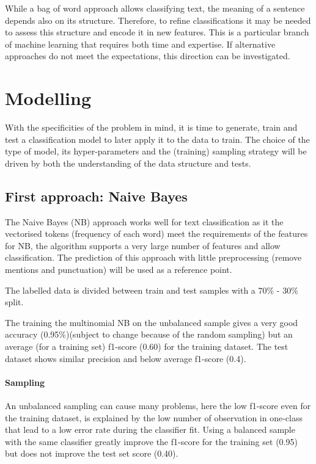 \documentclass[a4paper, justified]{tufte-handout}
\begin{document}
\begin{fullwidth}
While a bag of word approach allows classifying text, the meaning of a sentence depends also on its structure. Therefore, to refine classifications it may be needed to assess this structure and encode it in new features. This is a particular branch of machine learning that requires both time and expertise. If alternative approaches do not meet the expectations, this direction can be investigated.

\section{Modelling}

With the specificities of the problem in mind, it is time to generate, train and test a classification model to later apply it to the data to train. The choice of the type of model, its hyper-parameters and the (training) sampling strategy will be driven by both the understanding of the data structure and tests.

\subsection{First approach: Naive Bayes}

The Naive Bayes (NB) approach works well for text classification as it the vectorised tokens (frequency of each word) meet the requirements of the features for NB, the algorithm supports a very large number of features and allow classification. The prediction of this approach with little preprocessing (remove mentions and punctuation) will be used as a reference point.

The labelled data is divided between train and test samples with a 70\% - 30\% split.

The training the multinomial NB on the unbalanced sample gives a very good accuracy (0.95\%)(subject to change because of the random sampling) but an average (for a training set) f1-score (0.60) for the training dataset. The test dataset shows similar precision and below average f1-score (0.4).

\paragraph{Sampling}

An unbalanced sampling can cause many problems, here the low f1-score even for the training dataset, is explained by the low number of observation in one-class that lead to a low error rate during the classifier fit. Using a balanced sample with the same classifier greatly improve the f1-score for the training set (0.95) but does not improve the test set score (0.40). 


\end{fullwidth}
\end{document}
